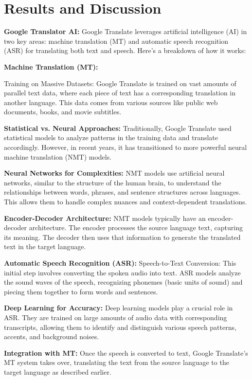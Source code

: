 \documentclass[12px, a4paper]{article}
\begin{document}
\section{Results and Discussion}
\textbf{Google Translator AI:}
    Google Translate leverages artificial intelligence (AI) in two key areas: machine translation (MT) and automatic speech recognition (ASR) for translating both text and speech. Here's a breakdown of how it works:

    \textbf{Machine Translation (MT):}

    Training on Massive Datasets: Google Translate is trained on vast amounts of parallel text data, where each piece of text has a corresponding translation in another language. This data comes from various sources like public web documents, books, and movie subtitles.

    \textbf{Statistical vs. Neural Approaches:} Traditionally, Google Translate used statistical models to analyze patterns in the training data and translate accordingly. However, in recent years, it has transitioned to more powerful neural machine translation (NMT) models.

    \textbf{Neural Networks for Complexities:} NMT models use artificial neural networks, similar to the structure of the human brain, to understand the relationships between words, phrases, and sentence structures across languages. This allows them to handle complex nuances and context-dependent translations.

    \textbf{Encoder-Decoder Architecture:}  NMT models typically have an encoder-decoder architecture. The encoder processes the source language text, capturing its meaning. The decoder then uses that information to generate the translated text in the target language.

    \textbf{Automatic Speech Recognition (ASR):}
    Speech-to-Text Conversion: This initial step involves converting the spoken audio into text. ASR models analyze the sound waves of the speech, recognizing phonemes (basic units of sound) and piecing them together to form words and sentences.

    \textbf{Deep Learning for Accuracy:}  Deep learning models play a crucial role in ASR. They are trained on large amounts of audio data with corresponding transcripts, allowing them to identify and distinguish various speech patterns, accents, and background noises.

    \textbf{Integration with MT:} Once the speech is converted to text, Google Translate's MT system takes over, translating the text from the source language to the target language as described earlier.
\end{document}
